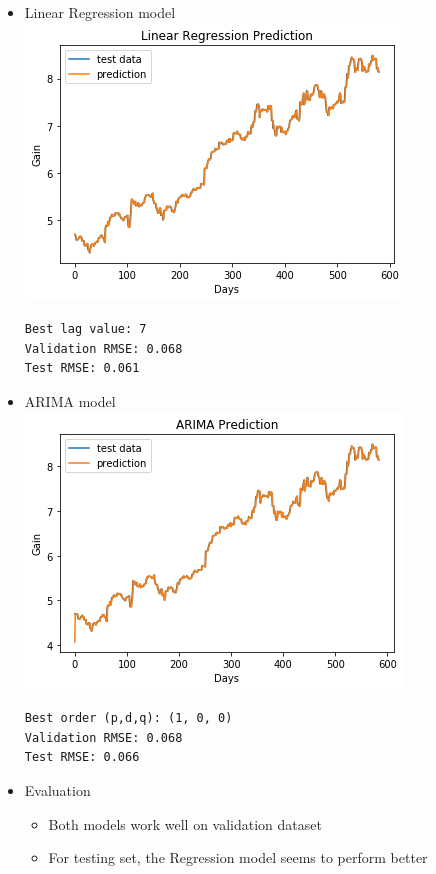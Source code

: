 \documentclass[11pt]{article}
\makeatletter
\def\maxwidth{\ifdim\Gin@nat@width>\linewidth\linewidth
    \else\Gin@nat@width\fi}
\let\Oldincludegraphics\includegraphics
\renewcommand{\includegraphics}[1]{\Oldincludegraphics[width=.8\maxwidth]{#1}}
\providecommand{\tightlist}{%
      \setlength{\itemsep}{0pt}\setlength{\parskip}{0pt}}
\makeatother
\begin{document}
\begin{itemize}
\item
  Linear Regression model \\
  \includegraphics{./figures/20.jpg}

\begin{verbatim}
Best lag value: 7
Validation RMSE: 0.068
Test RMSE: 0.061
\end{verbatim}
\item
  ARIMA model \\
  \includegraphics{./figures/21.jpg}

\begin{verbatim}
Best order (p,d,q): (1, 0, 0)
Validation RMSE: 0.068
Test RMSE: 0.066
\end{verbatim}
\item
  Evaluation

  \begin{itemize}
  \tightlist
  \item
    Both models work well on validation dataset
  \item
    For testing set, the Regression model seems to perform better
  \end{itemize}
\end{itemize}
\end{document}
